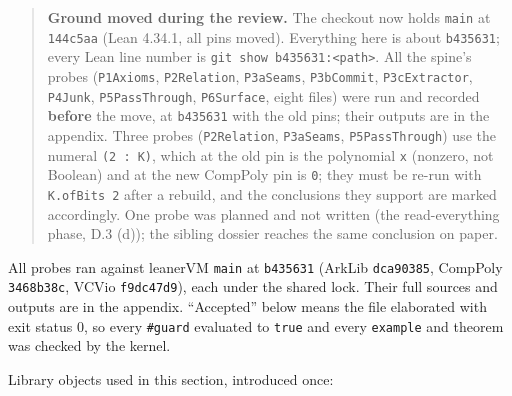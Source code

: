 \begin{quote}\small
\textbf{Ground moved during the review.} The checkout now holds \texttt{main} at \texttt{144c5aa} (Lean 4.34.1, all pins moved). Everything here is about \texttt{b435631}; every Lean line number is \texttt{git show b435631:<path>}. All the spine's probes (\texttt{P1Axioms}, \texttt{P2Relation}, \texttt{P3aSeams}, \texttt{P3bCommit}, \texttt{P3cExtractor}, \texttt{P4Junk}, \texttt{P5PassThrough}, \texttt{P6Surface}, eight files) were run and recorded \textbf{before} the move, at \texttt{b435631} with the old pins; their outputs are in the appendix. Three probes (\texttt{P2Relation}, \texttt{P3aSeams}, \texttt{P5PassThrough}) use the numeral \texttt{(\allowbreak{}2 : K)}, which at the old pin is the polynomial \texttt{x} (nonzero, not Boolean) and at the new CompPoly pin is \texttt{0}; they must be re-run with \texttt{K.\allowbreak{}ofBits 2} after a rebuild, and the conclusions they support are marked accordingly. One probe was planned and not written (the read-everything phase, D.3 (d)); the sibling dossier reaches the same conclusion on paper.
\end{quote}

All probes ran against leanerVM \texttt{main} at \texttt{b435631} (ArkLib \texttt{dca90385}, CompPoly \texttt{3468b38c}, VCVio \texttt{f9dc47d9}), each under the shared lock. Their full sources and outputs are in the appendix. \enquote{Accepted} below means the file elaborated with exit status 0, so every \texttt{\#guard} evaluated to \texttt{true} and every \texttt{example} and theorem was checked by the kernel.

Library objects used in this section, introduced once:

